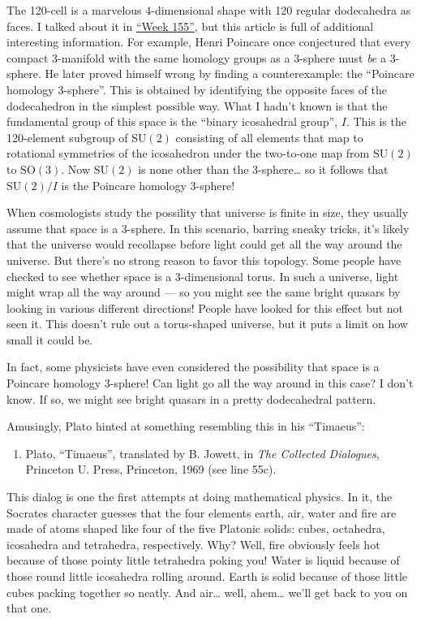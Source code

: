\documentclass{article}
\def\tightlist{}
\begin{document}
The 120-cell is a marvelous \(4\)-dimensional shape with 120 regular
dodecahedra as faces. I talked about it in
\protect\hyperlink{week155}{``Week 155''}, but this article is full of
additional interesting information. For example, Henri Poincare once
conjectured that every compact 3-manifold with the same homology groups
as a 3-sphere must \emph{be} a 3-sphere. He later proved himself wrong
by finding a counterexample: the ``Poincare homology 3-sphere''. This is
obtained by identifying the opposite faces of the dodecahedron in the
simplest possible way. What I hadn't known is that the fundamental group
of this space is the ``binary icosahedral group'', \(I\). This is the
120-element subgroup of \(\mathrm{SU}(2)\) consisting of all elements
that map to rotational symmetries of the icosahedron under the
two-to-one map from \(\mathrm{SU}(2)\) to \(\mathrm{SO}(3)\). Now
\(\mathrm{SU}(2)\) is none other than the 3-sphere\ldots{} so it follows
that \(\mathrm{SU}(2)/I\) is the Poincare homology 3-sphere!

When cosmologists study the possility that universe is finite in size,
they usually assume that space is a 3-sphere. In this scenario, barring
sneaky tricks, it's likely that the universe would recollapse before
light could get all the way around the universe. But there's no strong
reason to favor this topology. Some people have checked to see whether
space is a \(3\)-dimensional torus. In such a universe, light might wrap
all the way around --- so you might see the same bright quasars by
looking in various different directions! People have looked for this
effect but not seen it. This doesn't rule out a torus-shaped universe,
but it puts a limit on how small it could be.

In fact, some physicists have even considered the possibility that space
is a Poincare homology 3-sphere! Can light go all the way around in this
case? I don't know. If so, we might see bright quasars in a pretty
dodecahedral pattern.

Amusingly, Plato hinted at something resembling this in his ``Timaeus'':

\begin{enumerate}
\def\labelenumi{\arabic{enumi})}
\setcounter{enumi}{5}
\tightlist
\item
  Plato, ``Timaeus'', translated by B. Jowett, in \emph{The Collected
  Dialogues}, Princeton U. Press, Princeton, 1969 (see line 55c).
\end{enumerate}

This dialog is one the first attempts at doing mathematical physics. In
it, the Socrates character guesses that the four elements earth, air,
water and fire are made of atoms shaped like four of the five Platonic
solids: cubes, octahedra, icosahedra and tetrahedra, respectively. Why?
Well, fire obviously feels hot because of those pointy little tetrahedra
poking you! Water is liquid because of those round little icosahedra
rolling around. Earth is solid because of those little cubes packing
together so neatly. And air\ldots{} well, ahem\ldots{} we'll get back to
you on that one.
\end{document}

